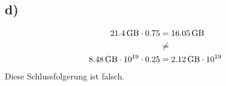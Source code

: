     \subsection*{d)}

      \begin{equation}
      	\begin{split}
      	  \SI{21.4}{\giga\byte} \cdot 0.75 & = \SI{16.05}{\giga\byte} \\
      	  & \neq \\
      	  \SI{8.48}{\giga\byte} \cdot 10^{19} \cdot 0.25 & = \SI{2.12}{\giga\byte} \cdot 10^{19}
      	\end{split}
      \end{equation}
      \newline
      Diese Schlussfolgerung ist falsch.


